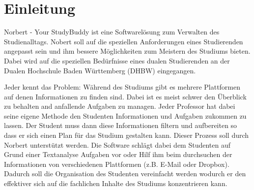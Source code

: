 
\chapter{Einleitung}
Norbert - Your StudyBuddy ist eine Softwarelösung zum Verwalten des Studienalltags. Nobert soll auf die speziellen Anforderungen eines Studierenden angepasst sein und ihm bessere Möglichkeiten zum Meistern des Studiums bieten. Dabei wird auf die speziellen Bedürfnisse eines dualen Studierenden an der Dualen Hochschule Baden Württemberg (DHBW) eingegangen.

Jeder kennt das Problem: Während des Studiums gibt es mehrere Plattformen auf denen Informationen zu finden sind. 
Dabei ist es meist schwer den Überblick zu behalten and anfallende Aufgaben zu managen.
Jeder Professor hat dabei seine eigene Methode den Studenten Informationen und Aufgaben zukommen zu lassen. Der Student muss dann diese Informationen filtern und aufbereiten so dass er sich einen Plan für das Studium gestalten kann.
Dieser Prozess soll durch Norbert unterstützt werden. 
Die Software schlägt dabei dem Studenten auf Grund einer Textanalyse Aufgaben vor oder Hilf ihm beim durchsuchen der Informationen von verschiedenen Plattformen (z.B. E-Mail oder Dropbox).
Dadurch soll die Organisation des Studenten vereinfacht werden wodurch er den effektiver sich auf die fachlichen Inhalte des Studiums konzentrieren kann.



